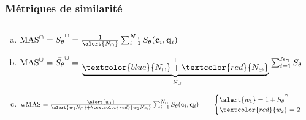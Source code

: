 \documentclass[aspectratio=169, usepdftitle=false, xcolor={dvipsnames}, 9pt,table]{beamer}
\begin{document}
 \begin{frame}[t]
     \frametitle{Métriques de similarité}
     \begin{columns}[t]
         \begin{column}{0.66\textwidth}
             \footnotesize
             \vspace{-1.5em}
             \begin{examples}
                 \begin{enumerate}[(a)]
                     \item<1-> $\text{MAS}^\cap = \bar{S_\theta}^\cap = \frac{1}{\alert{N_\cap}} \sum_{i=1}^{N_\cap} S_\theta (\mathbf{c}_i, \mathbf{q}_i)$
                     \item<2-> $\text{MAS}^\cup = \bar{S_\theta}^\cup = \frac{1}{\underbrace{\textcolor{blue}{N_\cap} + \textcolor{red}{N_\ominus}}_{=
                         N_\cup}} \sum_{i=1}^{N_\cap} S_\theta (\mathbf{c}_i, \mathbf{q}_i)$
                     \item<3-> $\text{wMAS} = \frac{ \alert{w_1}}{ \alert{w_1 N_\cap} + \textcolor{red}{w_2 N_\ominus}} \sum_{i=1}^{N_\cap} S_{\theta}(\mathbf{c}_i, \mathbf{q}_i) \quad\quad 
                     \begin{cases}
                         \alert{w_1} = 1 + \bar{S_\theta}^\cap \\
                         \textcolor{red}{w_2} = 2 - \bar{S_\theta}^\cap \\
                     \end{cases}$
                 \end{enumerate}
             \end{examples}
         \end{column}
         \begin{column}{0.33\textwidth}
             \footnotesize
\end{column}
\end{columns}
\end{frame}
\end{document}
